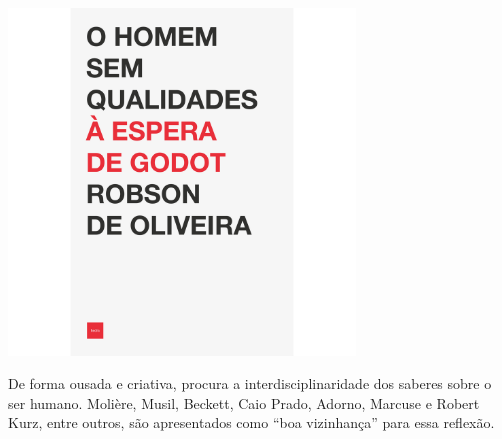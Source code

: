 \vfill

\hspace*{-.4cm}\begin{minipage}[c]{.5\linewidth}
\small{
{}}
\end{minipage}

\pagebreak


\begin{center}
\hspace*{-2.5cm}
\hspace*{2.5cm}\includegraphics[width=92mm]{./grid/robson.png}
\end{center}

\hspace*{-7cm}\hrulefill\hspace*{-7cm}

\medskip

\noindent{}De forma ousada e criativa, {} procura a interdisciplinaridade dos saberes sobre o ser humano. Molière, Musil, Beckett, Caio Prado, Adorno, Marcuse e Robert Kurz, entre outros, são apresentados como “boa vizinhança” para essa reflexão. 

